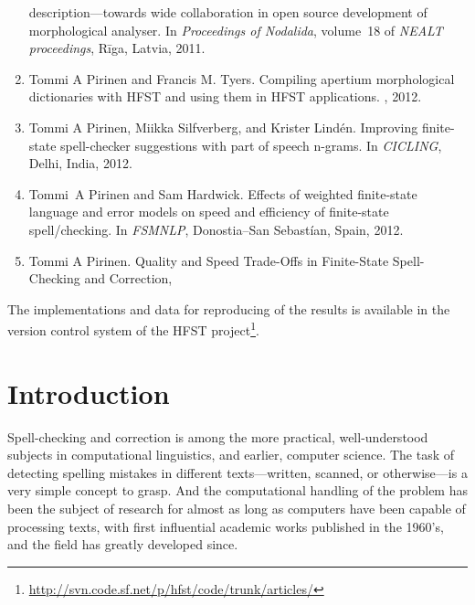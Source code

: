 \documentclass[officiallayout]{unihelcompling}
\newcommand\misspelt{\bgroup\markoverwith
{\textcolor{red}{\lower3.5pt\hbox{\sixly \char58}}}\ULon}
\begin{document}
\begin{enumerate}
        description—towards wide collaboration in open source development of
        morphological analyser.
        \newblock In {\em Proceedings of Nodalida}, volume~18 of {\em NEALT
        proceedings}, Rīga, Latvia, 2011.
    \item[\citetalias{pirinen2012compiling}]
        Tommi A Pirinen and Francis M. Tyers.
        \newblock Compiling apertium morphological dictionaries with HFST and
        using them in HFST applications.
        , 2012.
    \item[\citetalias{pirinen2012improving}]
        Tommi A Pirinen, Miikka Silfverberg, and Krister Lindén.
        \newblock Improving finite-state spell-checker suggestions with part of
        speech n-grams.
        \newblock In {\em CICLING}, Delhi, India, 2012.
    \item[\citetalias{pirinen2012effects}]
        Tommi~A Pirinen and Sam Hardwick.
        \newblock Effects of weighted finite-state language and error models on
        speed and efficiency of finite-state spell\-/checking.
        \newblock In {\em FSMNLP}, Donostia--San Sebastían, Spain, 2012.
    \item[\citetalias{pirinen2013quality}]
        Tommi A Pirinen.
        \newblock Quality and Speed Trade-Offs in
        Finite-State Spell-Checking and Correction, \misspelt{forthcoming}
\end{enumerate}

The implementations and data for reproducing of the results is available
in the version control system of the HFST project\footnote{\url{http://svn.code.sf.net/p/hfst/code/trunk/articles/}}.

\tableofcontents

\listoftodos

\chapter{Introduction}
\label{chap:introduction}

Spell-checking and correction is among the more practical, well-understood
subjects in computational linguistics, and earlier, computer science.
The task of detecting spelling mistakes in different texts---written, scanned,
or otherwise---is a very simple concept to grasp. And the computational
handling of the problem has been the subject of research for almost as long as
computers have been capable of processing texts, with first influential
academic works published in the 1960's, and the field has greatly developed
since.
\end{document}
